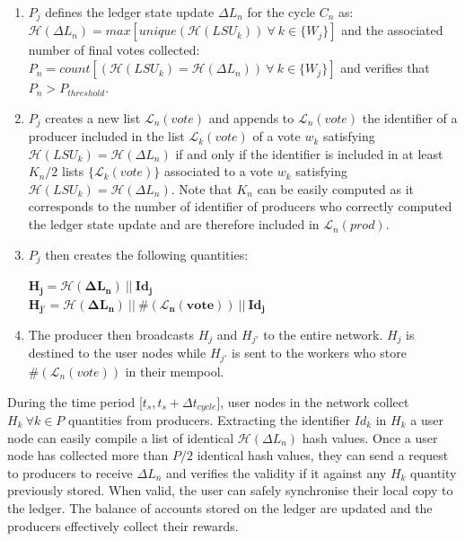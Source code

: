 \begin{enumerate}
\item $P_j$ defines the ledger state update $\Delta L_n$ for the cycle $C_n$ as:\\
 $\mathcal{H}(\Delta L_n)  = max[unique(\mathcal{H}(LSU_k))~\forall~k\in\{W_j\}]$ and the associated number of final votes collected: $P_n = count[(\mathcal{H}(LSU_k) = \mathcal{H}(\Delta L_n))~\forall~k\in\{W_j\}]$ and verifies that $P_n > P_{threshold}$.
\item $P_j$ creates a new list $\mathcal{L}_{n}(vote)$ and appends to $\mathcal{L}_{n}(vote)$ the identifier of a producer included in the list $\mathcal{L}_{k}(vote)$ of a vote $w_k$ satisfying $\mathcal{H}(LSU_k) = \mathcal{H}(\Delta L_n)$ if and only if the identifier is included in at least $K_n/2$ lists $\{\mathcal{L}_{k}(vote)\}$ associated to a vote $w_{k}$ satisfying $\mathcal{H}(LSU_k) = \mathcal{H}(\Delta L_n)$. Note that $K_n$ can be easily computed as it corresponds to the number of identifier of producers who correctly computed the ledger state update and are therefore included in $\mathcal{L}_{n}(prod)$.
\item $P_j$ then creates the following quantities:
\begin{center}
$\mathbf{H_j = \mathcal{H}(\Delta L_n)~||~Id_j}$\\
$\mathbf{H_{j'} = \mathcal{H}(\Delta L_n)~||~\#(\mathcal{L}_{n}(vote))~||~Id_j}$
\end{center}
\item The producer then broadcasts $H_j$ and  $H_{j'}$  to the entire network. $H_j$ is destined to the user nodes while  $H_{j'}$ is sent to the workers who store $\#(\mathcal{L}_{n}(vote))$ in their mempool. 
\end{enumerate}

During the time period [$t_{s}, t_s + \Delta t_{cycle}$], user nodes in the network collect $H_k~\forall k \in P$ quantities from producers. Extracting the identifier $Id_k$ in $H_k$ a user node can easily compile a list of identical $\mathcal{H}(\Delta L_n)$ hash values. Once a user node has collected more than $P/2$ identical hash values, they can send a request to producers to receive $\Delta L_n$ and verifies the validity if it against any $H_k$ quantity previously stored. When valid, the user can safely synchronise their local copy to the ledger. The balance of accounts stored on the ledger are updated and the producers effectively collect their rewards. \\


